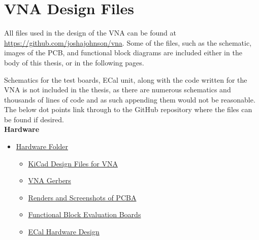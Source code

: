 \section{VNA Design Files}
\label{appen:vna_design_files}

All files used in the design of the VNA can be found at \url{https://github.com/joshajohnson/vna}. 
Some of the files, such as the schematic, images of the PCB, and functional block diagrams are included either in the body of this thesis, or in the following pages. 

Schematics for the test boards, ECal unit, along with the code written for the VNA is not included in the thesis, as there are numerous schematics and thousands of lines of code and as such appending them would not be reasonable. The below dot points link through to the GitHub repository where the files can be found if desired. \\

\textbf{Hardware}
\begin{itemize}
	\item \href{https://github.com/joshajohnson/vna/tree/master/Hardware}{Hardware Folder}

\begin{itemize}
	\item \href{https://github.com/joshajohnson/vna/tree/master/Hardware/VNAv0}{KiCad Design Files for VNA}
	\item \href{https://github.com/joshajohnson/vna/tree/master/Hardware/VNAv0/gerbers}{VNA Gerbers}
	\item \href{https://github.com/joshajohnson/vna/tree/master/Hardware/VNAv0/renders_screenshots}{Renders and Screenshots of PCBA}
	\item \href{https://github.com/joshajohnson/vna/tree/master/Hardware/Test\%20Boards}{Functional Block Evaluation Boards}
	\item \href{https://github.com/joshajohnson/vna/tree/master/Hardware/Ecal}{ECal Hardware Design}\\
\end{itemize}
\end{itemize}

